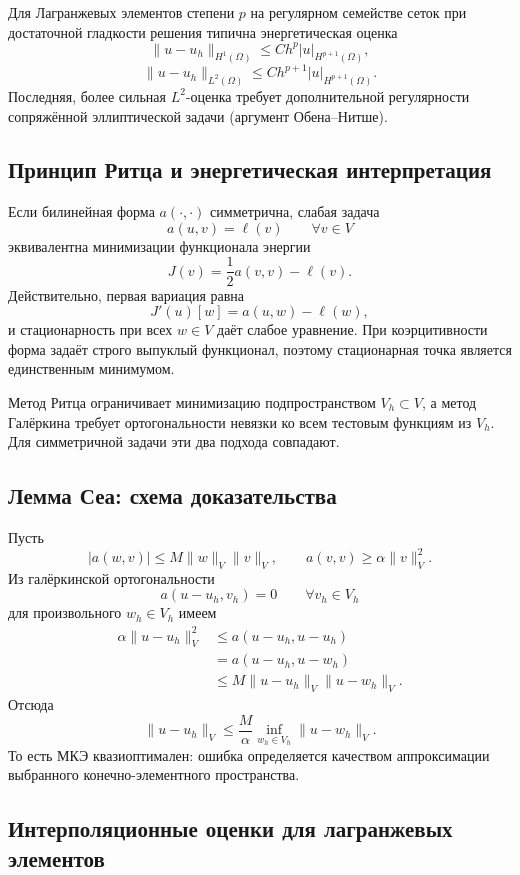 Для Лагранжевых элементов степени $p$ на регулярном семействе сеток при
достаточной гладкости решения типична энергетическая оценка
\[
    \|u-u_h\|_{H^1(\Omega)}\leq C h^p|u|_{H^{p+1}(\Omega)},
\]
\[
    \|u-u_h\|_{L^2(\Omega)}\leq C h^{p+1}|u|_{H^{p+1}(\Omega)}.
\]
Последняя, более сильная $L^2$-оценка требует дополнительной регулярности
сопряжённой эллиптической задачи (аргумент Обена--Нитше).

\subsection{Принцип Ритца и энергетическая интерпретация}

Если билинейная форма $a(\cdot,\cdot)$ симметрична, слабая задача
\[
    a(u,v)=\ell(v)\qquad \forall v\in V
\]
эквивалентна минимизации функционала энергии
\[
    J(v)=\frac12 a(v,v)-\ell(v).
\]
Действительно, первая вариация равна
\[
    J'(u)[w]=a(u,w)-\ell(w),
\]
и стационарность при всех $w\in V$ даёт слабое уравнение. При коэрцитивности форма
задаёт строго выпуклый функционал, поэтому стационарная точка является единственным
минимумом.

Метод Ритца ограничивает минимизацию подпространством $V_h\subset V$, а метод Галёркина
требует ортогональности невязки ко всем тестовым функциям из $V_h$. Для симметричной
задачи эти два подхода совпадают.

\subsection{Лемма Сеа: схема доказательства}

Пусть
\[
    |a(w,v)|\le M\|w\|_V\|v\|_V,
    \qquad
    a(v,v)\ge \alpha\|v\|_V^2.
\]
Из галёркинской ортогональности
\[
    a(u-u_h,v_h)=0\qquad\forall v_h\in V_h
\]
для произвольного $w_h\in V_h$ имеем
\[
\begin{aligned}
    \alpha\|u-u_h\|_V^2
    &\le a(u-u_h,u-u_h)\\
    &=a(u-u_h,u-w_h)\\
    &\le M\|u-u_h\|_V\|u-w_h\|_V.
\end{aligned}
\]
Отсюда
\[
    \|u-u_h\|_V
    \le \frac{M}{\alpha}
    \inf_{w_h\in V_h}\|u-w_h\|_V.
\]
То есть МКЭ квазиоптимален: ошибка определяется качеством аппроксимации выбранного
конечно-элементного пространства.

\subsection{Интерполяционные оценки для лагранжевых элементов}


